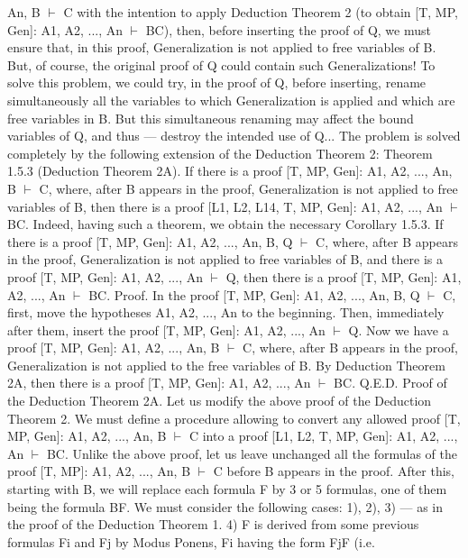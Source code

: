 An, B \(\vdash\) C with the intention to apply Deduction Theorem 2 (to obtain [T, MP, Gen]: A1, A2, ..., An \(\vdash\)
B\IMPLIES C), then, before inserting the proof of Q, we must ensure that, in this proof, Generalization is not
applied to free variables of B. But, of course, the original proof of Q could contain such Generalizations!
To solve this problem, we could try, in the proof of Q, before inserting, rename simultaneously all the
variables to which Generalization is applied and which are free variables in B. But this simultaneous
renaming may affect the bound variables of Q, and thus --- destroy the intended use of Q...
The problem is solved completely by the following extension of the Deduction Theorem 2:
Theorem 1.5.3 (Deduction Theorem 2A). If there is a proof [T, MP, Gen]: A1, A2, ..., An, B \(\vdash\) C, where,
after B appears in the proof, Generalization is not applied to free variables of B, then there is a proof
[L1, L2, L14, T, MP, Gen]: A1, A2, ..., An \(\vdash\) B\IMPLIES C.
Indeed, having such a theorem, we obtain the necessary
Corollary 1.5.3. If there is a proof [T, MP, Gen]: A1, A2, ..., An, B, Q \(\vdash\) C, where, after B appears in the
proof, Generalization is not applied to free variables of B, and there is a proof [T, MP, Gen]: A1, A2, ...,
An \(\vdash\) Q, then there is a proof [T, MP, Gen]: A1, A2, ..., An \(\vdash\) B\IMPLIES C.
Proof. In the proof [T, MP, Gen]: A1, A2, ..., An, B, Q \(\vdash\) C, first, move the hypotheses A1, A2, ..., An to the
beginning. Then, immediately after them, insert the proof [T, MP, Gen]: A1, A2, ..., An \(\vdash\) Q. Now we have
a proof [T, MP, Gen]: A1, A2, ..., An, B \(\vdash\) C, where, after B appears in the proof, Generalization is not
applied to the free variables of B. By Deduction Theorem 2A, then there is a proof [T, MP, Gen]: A1,
A2, ..., An \(\vdash\) B\IMPLIES C. Q.E.D.
Proof of the Deduction Theorem 2A. Let us modify the above proof of the Deduction Theorem 2.
We must define a procedure allowing to convert any allowed proof [T, MP, Gen]: A1, A2, ..., An, B \(\vdash\) C
into a proof [L1, L2, T, MP, Gen]: A1, A2, ..., An \(\vdash\) B\IMPLIES C.
Unlike the above proof, let us leave unchanged all the formulas of the proof [T, MP]: A1, A2, ..., An, B \(\vdash\)
C before B appears in the proof. After this, starting with B, we will replace each formula F by 3 or 5
formulas, one of them being the formula B\IMPLIES F.
We must consider the following cases:
1), 2), 3) --- as in the proof of the Deduction Theorem 1.
4) F is derived from some previous formulas Fi and Fj by Modus Ponens, Fi having the form Fj\IMPLIES F (i.e.
